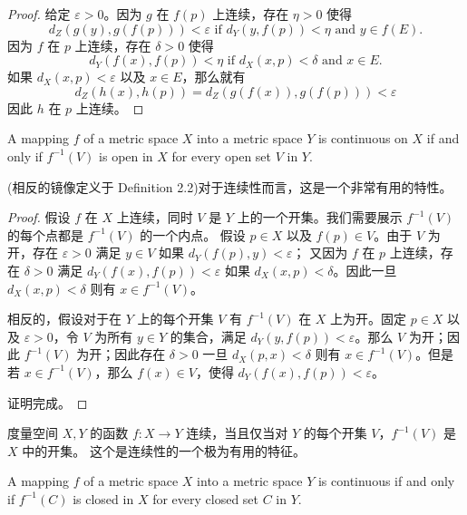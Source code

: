 \documentclass[../poma-notes.tex]{subfiles}
\begin{document}
\begin{proof}
  给定 $\varepsilon > 0$。因为 $g$ 在 $f(p)$ 上连续，存在 $\eta > 0$ 使得
  \[
    d_Z(g(y),g(f(p))) < \varepsilon \text{ if } d_Y(y,f(p)) < \eta \text{ and } y \in f(E).
  \]
  因为 $f$ 在 $p$ 上连续，存在 $\delta > 0$ 使得
  \[
    d_Y(f(x),f(p)) < \eta \text{ if } d_X(x,p) < \delta \text{ and } x \in E.
  \]
  如果 $d_X(x,p) < \varepsilon$ 以及 $x \in E$，那么就有
  \[
    d_Z(h(x),h(p)) = d_Z(g(f(x)), g(f(p))) < \varepsilon
  \]
  因此 $h$ 在 $p$ 上连续。
\end{proof}

\begin{theorem}
  A mapping $f$ of a metric space $X$ into a metric space $Y$ is continuous on $X$ if and only if $f^{-1}(V)$
  is open in $X$ for every open set $V$ in $Y$.
\end{theorem}

(相反的镜像定义于 Definition 2.2)对于连续性而言，这是一个非常有用的特性。

\begin{proof}
  假设 $f$ 在 $X$ 上连续，同时 $V$ 是 $Y$ 上的一个开集。我们需要展示 $f^{-1}(V)$ 的每个点都是 $f^{-1}(V)$ 的一个内点。
  假设 $p \in X$ 以及 $f(p) \in V$。由于 $V$ 为开，存在 $\varepsilon > 0$ 满足 $y \in V$ 如果 $d_Y(f(p),y)<\varepsilon$；
  又因为 $f$ 在 $p$ 上连续，存在 $\delta > 0$ 满足 $d_Y(f(x),f(p))<\varepsilon$ 如果 $d_X(x,p)<\delta$。因此一旦
  $d_X(x,p)<\delta$ 则有 $x \in f^{-1}(V)$。

  相反的，假设对于在 $Y$ 上的每个开集 $V$ 有 $f^{-1}(V)$ 在 $X$ 上为开。固定 $p \in X$ 以及 $\varepsilon > 0$，令 $V$
  为所有 $y \in Y$ 的集合，满足 $d_Y(y,f(p))<\varepsilon$。那么 $V$ 为开；因此 $f^{-1}(V)$ 为开；因此存在 $\delta > 0$
  一旦 $d_X(p,x) < \delta$ 则有 $x \in f^{-1}(V)$。但是若 $x \in f^{-1}(V)$，那么 $f(x) \in V$，使得
  $d_Y(f(x),f(p))<\varepsilon$。

  证明完成。
\end{proof}

\begin{anote}
  度量空间 $X, Y$ 的函数 $f: X \to Y$ 连续，当且仅当对 $Y$ 的每个开集 $V$，$f^{-1}(V)$ 是 $X$ 中的开集。
  这个是连续性的一个极为有用的特征。
\end{anote}

\begin{corollary}
  A mapping $f$ of a metric space $X$ into a metric space $Y$ is continuous if and only if $f^{-1}(C)$ is closed
  in $X$ for every closed set $C$ in $Y$.
\end{corollary}
\end{document}
